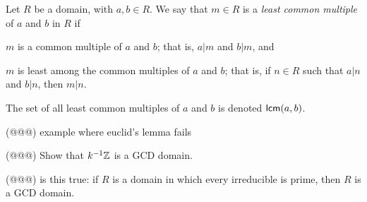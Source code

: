 \begin{dfn}
Let \(R\) be a domain, with \(a,b \in R\). We say that \(m \in R\) is a \emph{least common multiple}  of \(a\) and \(b\) in \(R\) if
\begin{proplist}
\item \(m\) is a common multiple of \(a\) and \(b\); that is, \(a|m\) and \(b|m\), and 
\item \(m\) is least among the common multiples of \(a\) and \(b\); that is, if \(n \in R\) such that \(a|n\) and \(b|n\), then \(m|n\).
\end{proplist}
The set of all least common multiples of \(a\) and \(b\) is denoted \(\mathsf{lcm}(a, b)\).
\end{dfn}

\begin{exercise}
(@@@) example where euclid's lemma fails
\end{exercise}

\begin{exercise}
(@@@) Show that \({k}^{-1}\mathbb{Z}\) is a GCD domain.
\end{exercise}

\begin{exercise}
(@@@) is this true: if \(R\) is a domain in which every irreducible is prime, then \(R\) is a GCD domain.
\end{exercise}

